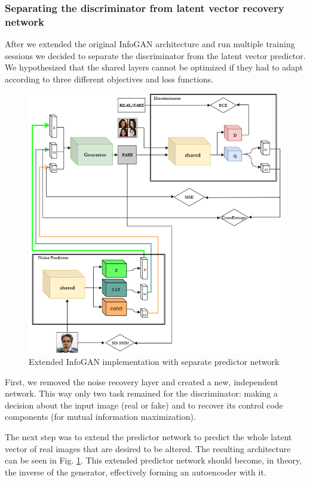 \documentclass[10pt,journal,compsoc]{IEEEtran}
\begin{document}
\subsubsection{Separating the discriminator from latent vector recovery network}

After we extended the original InfoGAN architecture and run multiple training sessions we decided to separate the discriminator from the latent vector predictor. We hypothesized that the shared layers cannot be optimized if they had to adapt according to three different objectives and loss functions.

\begin{figure}[h]
	\centering
	\includegraphics[width=\linewidth]{pic/2}
	\caption{Extended InfoGAN implementation with separate predictor network}
	\label{fig:infogan_noise}
\end{figure}

First, we removed the noise recovery layer and created a new, independent network. This way only two task remained for the discriminator: making a decision about the input image (real or fake) and to recover its control code components (for mutual information maximization).

The next step was to extend the predictor network to predict the whole latent vector of real images that are desired to be altered. The resulting architecture can be seen in Fig. \ref{fig:infogan_noise}. This extended predictor network should become, in theory, the inverse of the generator, effectively forming an autoencoder with it.
\end{document}
